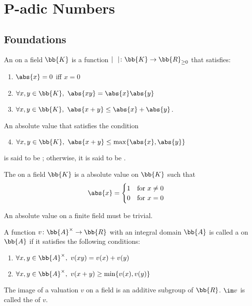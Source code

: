\section{P-adic Numbers\cite{gouvea}}
\subsection{Foundations}
An  on a field $\bb{K}$ is a function $\mid \ \ \mid \colon \bb{K} \to \bb{R}_{\ge0}$ that satisfies:
\begin{enumerate}
\item $\abs{x} = 0$ iff $x = 0$
\item $\forall x, y \in \bb{K},\ \abs{xy} = \abs{x}\abs{y}$
\item $\forall x, y \in \bb{K},\ \abs{x+y} \le \abs{x}+\abs{y}$.
\end{enumerate}

An absolute value that satisfies the condition
\begin{enumerate}
\setcounter{enumi}{3}
\item $\forall x, y \in \bb{K},\ \abs{x+y} \le \max \{ \abs{x},\abs{y} \}$
\end{enumerate}
is said to be ; otherwise, it is said to be .

The  on a field $\bb{K}$ is a absolute value on $\bb{K}$ such that
\[
\abs{x} = \begin{cases}
 1 & \text{for}\ x \neq 0 \\
 0 & \text{for}\ x = 0
 \end{cases}
\]

An absolute value on a finite field must be trivial.

A function $v \colon \bb{A}^\times \to \bb{R}$ with an integral domain $\bb{A}$ is called a  on $\bb{A}$ if it satisfies the following conditions:
\begin{enumerate}
\item $\forall x, y \in \bb{A}^\times,\ v(xy) = v(x) + v(y)$
\item $\forall x, y \in \bb{A}^\times,\ v(x+y) \ge \min \{ v(x), v(y) \}$
\end{enumerate}

The image of a valuation $v$ on a field is an additive subgroup of $\bb{R}$. $\im v$ is called the  of $v$.

